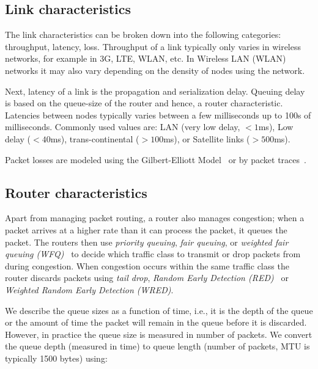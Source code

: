 



\subsection{Link characteristics}

The link characteristics can be broken down into the following categories:
throughput, latency, loss. Throughput of a link typically only varies in
wireless networks, for example in 3G, LTE, WLAN, etc. In Wireless LAN (WLAN)
networks it may also vary depending on the density of nodes using the network.

Next, latency of a link is the propagation and serialization delay. Queuing
delay is based on the queue-size of the router and hence, a router
characteristic. Latencies between nodes typically varies between a few
milliseconds up to 100s of milliseconds. Commonly used values are: LAN (very
low delay, $<1$ms), Low delay ($<40$ms), trans-continental ($>100$ms), or
Satellite links ($>500$ms).

Packet losses are modeled using the Gilbert-Elliott
Model~\cite{gilbert1960capacity, elliott1963estimates} or by packet
traces~\cite{ellis:2011:dataset, 3gppSim}.


\subsection{Router characteristics}


Apart from managing packet routing, a router also manages congestion; when a
packet arrives at a higher rate than it can process the packet, it queues the
packet. The routers then use \emph{priority queuing}, \emph{fair queuing}, or
\emph{weighted fair queuing (WFQ)}~\cite{rfc4594} to decide which traffic
class to transmit or drop packets from during congestion. When congestion
occurs within the same traffic class the router discards packets using
\emph{tail drop}, \emph{Random Early Detection (RED)}~\cite{Floyd:RED} or
\emph{Weighted Random Early Detection (WRED)}.

We describe the queue sizes as a function of time, i.e., it is the depth of
the queue or the amount of time the packet will remain in the queue before it
is discarded. However, in practice the queue size is measured in number of
packets. We convert the queue depth (measured in time) to queue length (number
of packets, MTU is typically 1500 bytes) using:

